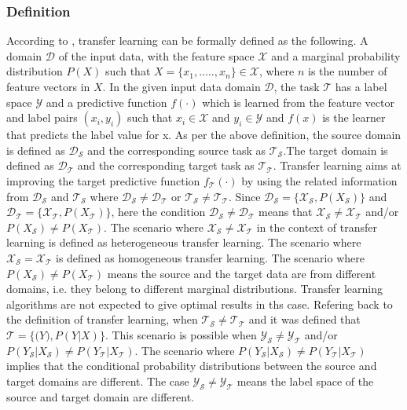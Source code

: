\subsubsection{Definition}
According to \cite{weiss2016survey,pan2009survey}, transfer learning can be formally defined as the following. A domain $\mathcal{D}$ of the input data, with the feature space $\mathcal{X}$ and a marginal probability distribution $P(X)$ such that $X=\{x_{1},.....,x_{n}\} \in \mathcal{X}$, where $n$ is the number of feature vectors in $X$. In the given input data domain $\mathcal{D}$, the task $\mathcal{T}$ has a label space $\mathcal{Y}$ and a predictive function $f(\cdot)$ which is learned from the feature vector and label pairs $(x_{i},y_{i})$ such that $x_{i} \in \mathcal{X}$ and $y_{i} \in \mathcal{Y}$ and $f(x)$ is the learner that predicts the label value for x. As per the above definition, the source domain is defined as $\mathcal{D_{\mathcal{S}}}$ and the corresponding source task as $\mathcal{T_{\mathcal{S}}}$.The target domain is defined as $\mathcal{D_{\mathcal{T}}}$ and the corresponding target task as $\mathcal{T_{\mathcal{T}}}$. Transfer learning aims at improving the target predictive function $f_{\mathcal{T}}(\cdot)$ by using the related information from $\mathcal{D_{\mathcal{S}}}$ and $\mathcal{T_{\mathcal{S}}}$ where $\mathcal{D_{\mathcal{S}}}\neq \mathcal{D_{\mathcal{T}}}$ or $\mathcal{T_{\mathcal{S}}}\neq \mathcal{T_{\mathcal{T}}}$. Since $\mathcal{D_{\mathcal{S}}} = \{\mathcal{X_{\mathcal{S}}},P(X_{\mathcal{S}})\}$ and $\mathcal{D_{\mathcal{T}}} = \{\mathcal{X_{\mathcal{T}}},P(X_{\mathcal{T}})\}$, here the condition $\mathcal{D_{\mathcal{S}}}\neq \mathcal{D_{\mathcal{T}}}$ means that $\mathcal{X_{\mathcal{S}}}\neq \mathcal{X_{\mathcal{T}}}$ and/or $P(X_{\mathcal{S}}) \neq P(X_{\mathcal{T}})$. The scenario where $\mathcal{X_{\mathcal{S}}}\neq \mathcal{X_{\mathcal{T}}}$ in the context of transfer learning is defined as heterogeneous transfer learning. The scenario where $\mathcal{X_{\mathcal{S}}} = \mathcal{X_{\mathcal{T}}}$ is defined as homogeneous transfer learning. The scenario where $P(X_{\mathcal{S}}) \neq P(X_{\mathcal{T}})$ means the source and the target data are from different domains, i.e. they belong to different marginal distributions. Transfer learning algorithms are not expected to give optimal results in ths case. Refering back to the definition of transfer learning, when $\mathcal{T_{\mathcal{S}}}\neq \mathcal{T_{\mathcal{T}}}$ and it was defined that $\mathcal{T} = \{\mathcal(Y),P(Y|X)\}$. This scenario is possible when $\mathcal{Y_{\mathcal{S}}} \neq \mathcal{Y_{\mathcal{T}}}$ and/or $P(Y_{\mathcal{S}}|X_{\mathcal{S}}) \neq P(Y_{\mathcal{T}}|X_{\mathcal{T}})$. The scenario where $P(Y_{\mathcal{S}}|X_{\mathcal{S}}) \neq P(Y_{\mathcal{T}}|X_{\mathcal{T}})$ implies that the conditional probability distributions between the source and target domains are different. The case $\mathcal{Y_{\mathcal{S}}} \neq \mathcal{Y_{\mathcal{T}}}$ means the label space of the source and target domain are different.\cite{weiss2016survey}
